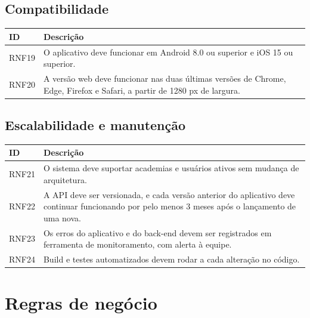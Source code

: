 \subsection{Compatibilidade}
\begin{tabularx}{\textwidth}{@{}l L@{}}
  \toprule
  \textbf{ID} & \textbf{Descrição} \\
  \midrule
  RNF19 & O aplicativo deve funcionar em Android 8.0 ou superior e iOS 15 ou superior.  \\
  RNF20 & A versão web deve funcionar nas duas últimas versões de Chrome, Edge, Firefox e Safari, a partir de 1280 px de largura. \\
  \bottomrule
\end{tabularx}

\subsection{Escalabilidade e manutenção}
\begin{tabularx}{\textwidth}{@{}l L@{}}
  \toprule
  \textbf{ID} & \textbf{Descrição} \\
  \midrule
  RNF21 & O sistema deve suportar  academias e  usuários ativos sem mudança de arquitetura. \\
  RNF22 & A API deve ser versionada, e cada versão anterior do aplicativo deve continuar funcionando por pelo menos 3 meses após o lançamento de uma nova. \\
  RNF23 & Os erros do aplicativo e do back-end devem ser registrados em ferramenta de monitoramento, com alerta à equipe. \\
  RNF24 & Build e testes automatizados devem rodar a cada alteração no código. \\
  \bottomrule
\end{tabularx}

\section{Regras de negócio}

